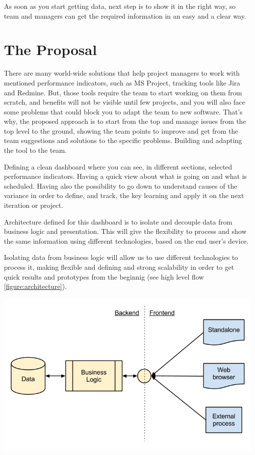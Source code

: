 \documentclass[a4paper,12pt]{article}
\begin{document}
\begin{multicols}{2}
As soon as you start getting data, next step is to show it in the right way, so
team and managers can get the required information in an easy and a clear way.

\section{The Proposal}
There are many world-wide solutions that help project managers to work with
mentioned performance indicators, such as MS Project, tracking tools
like Jira and Redmine. But, those tools require the team to start working on
them from scratch, and benefits will not be visible until few projects, and you
will also face some problems that could block you to adapt the team to new
software. That's why, the proposed approach is to start from the top and manage
issues from the top level to the ground, showing the team points to improve and
get from the team suggestions and solutions to the specific problems. Building
and adapting the tool to the team.

Defining a clean dashboard where you can see, in different sections, selected
performance indicators. Having a quick view about what is going on and what is
scheduled. Having also the possibility to go down to understand causes of the
variance in order to define, and track, the key learning and apply it on the
next iteration or project.

Architecture defined for this dashboard is to isolate and decouple data from
business logic and presentation. This will give the flexibility to process and
show the same information using different technologies, based on the end user's
device.

Isolating data from business logic will allow us to use different technologies
to process it, making flexible and defining and strong scalability in order to get
quick results and prototypes from the beginnig (see high level flow
\ref{figure:architecture}).

\end{multicols}
\begin{center}
	\includegraphics[width=1.0\textwidth]{resources/architecture.png}
	\label{figure:architecture}
\end{center}
\end{document}
